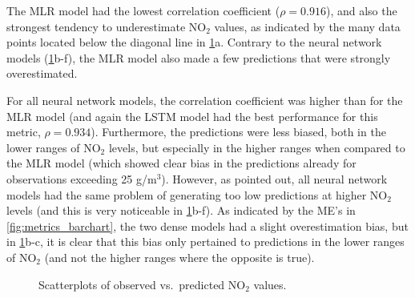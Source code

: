 The MLR model had the lowest correlation coefficient ($\rho = 0.916$), and also the strongest tendency to underestimate NO$_2$ values, as indicated by the many data points located below the diagonal line in \cref{fig:correlations}a. Contrary to the neural network models (\cref{fig:correlations}b-f), the MLR model also made a few predictions that were strongly overestimated. 

For all neural network models, the correlation coefficient was higher than for the MLR model (and again the LSTM model had the best performance for this metric, $\rho=0.934$). Furthermore, the predictions were less biased, both in the lower ranges of NO$_2$ levels, but especially in the higher ranges when compared to the MLR model (which showed clear bias in the predictions already for observations exceeding 25 \textmugreek g/m$^3$). However, as pointed out, all neural network models had the same problem of generating too low predictions at higher NO$_2$ levels (and this is very noticeable in \cref{fig:correlations}b-f). As indicated by the ME's in \cref{fig:metrics_barchart}, the two dense models had a slight overestimation bias, but in \cref{fig:correlations}b-c, it is clear that this bias only pertained to predictions in the lower ranges of NO$_2$ (and not the higher ranges where the opposite is true).
 
\begin{figure}[h]
\centering
\caption{Scatterplots of observed vs.\ predicted NO$_2$ values.}
\label{fig:correlations}
\end{figure}

